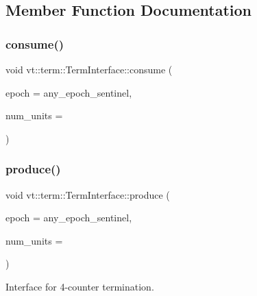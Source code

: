 \subsection{Member Function Documentation}
\mbox{\label{structvt_1_1term_1_1_term_interface_a6e117a0857540c82133b7a10bfa5d39e}} 
\subsubsection{\texorpdfstring{consume()}{consume()}}
{\footnotesize\ttfamily void vt\+::term\+::\+Term\+Interface\+::consume (\begin{DoxyParamCaption}\item[{\hyperlink{namespacevt_a81d11b28122d43bf9834577e4a06440f}{Epoch\+Type}}]{epoch = {\ttfamily any\+\_\+epoch\+\_\+sentinel},  }\item[{\hyperlink{namespacevt_1_1term_a4fd378cdb0c36683afc1b3399d685f7f}{Term\+Counter\+Type} const \&}]{num\+\_\+units = {} }\end{DoxyParamCaption})}

\mbox{\label{structvt_1_1term_1_1_term_interface_a38661883a7d3a721e50c6ab2d9e10edb}} 
\subsubsection{\texorpdfstring{produce()}{produce()}}
{\footnotesize\ttfamily void vt\+::term\+::\+Term\+Interface\+::produce (\begin{DoxyParamCaption}\item[{\hyperlink{namespacevt_a81d11b28122d43bf9834577e4a06440f}{Epoch\+Type}}]{epoch = {\ttfamily any\+\_\+epoch\+\_\+sentinel},  }\item[{\hyperlink{namespacevt_1_1term_a4fd378cdb0c36683afc1b3399d685f7f}{Term\+Counter\+Type} const \&}]{num\+\_\+units = {} }\end{DoxyParamCaption})}



Interface for 4-\/counter termination. 

